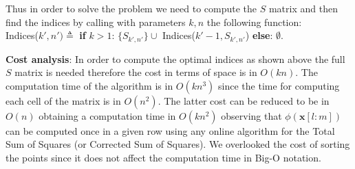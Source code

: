 \documentclass[a4paper]{article}
\begin{document}
\begin{enumerate}
    Thus in order to solve the problem we need to compute the $S$ matrix and
    then find the indices by calling with parameters $k, n$ the following
    function: \\ Indices($k', n')\triangleq $\textbf{ if} $k > 1$:
    $\{S_{k',n'}\} \cup$
    Indices($k'-1, S_{k',n'}$) \textbf{else}: $\emptyset $.

    \textbf{Cost analysis}: In order to compute the optimal indices as shown
    above the full $S$ matrix is needed therefore the cost in terms of space is
    in $O(kn)$. The computation time of the algorithm is in $O(kn^3)$ since
    the time for computing each cell of the matrix is in $O(n^2)$. The latter
    cost can be reduced to be in $O(n)$ obtaining a computation time in
    $O(kn^2)$ observing that $\phi(\mathbf{x}[l:m])$ can be computed once in a
    given row using any online algorithm for the Total Sum of Squares (or
    Corrected Sum of Squares). We overlooked the cost of sorting the points
    since it does not affect the computation time in Big-O notation.
\end{enumerate}

    \iffalse
    \begin{figure}[!htbp]
    \begin{center}
    \texttt{[image: house.png]}
    \end{center}
    \caption{\textit{The house subgraph}}\label{house}
    \end{figure}
    \fi
\end{document}
